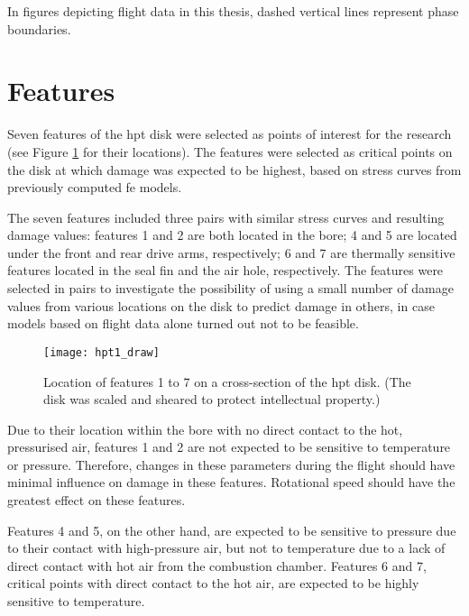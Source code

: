 In figures depicting flight data in this thesis, dashed vertical lines represent phase boundaries.

\section{Features} \label{sec:features}
Seven features of the \ac{hpt} disk were selected as points of interest for the research (see Figure \ref{fig:hpt1} for their locations). The features were selected as critical points on the disk at which damage was expected to be highest, based on stress curves from previously computed \ac{fe} models.

The seven features included three pairs with similar stress curves and resulting damage values: features 1 and 2 are both located in the bore; 4 and 5 are located under the front and rear drive arms, respectively; 6 and 7 are thermally sensitive features located in the seal fin and the air hole, respectively. The features were selected in pairs to investigate the possibility of using a small number of damage values from various locations on the disk to predict damage in others, in case models based on flight data alone turned out not to be feasible.

\begin{figure}[tb!]
    \centering
    \texttt{[image: hpt1\_draw]}
    \caption{\label{fig:hpt1} Location of features 1 to 7 on a cross-section of the \ac{hpt} disk. (The disk was scaled and sheared to protect intellectual property.)}
\end{figure}

Due to their location within the bore with no direct contact to the hot, pressurised air, features 1 and 2 are not expected to be sensitive to temperature or pressure. Therefore, changes in these parameters during the flight should have minimal influence on damage in these features. Rotational speed should have the greatest effect on these features.

Features 4 and 5, on the other hand, are expected to be sensitive to pressure due to their contact with high-pressure air, but not to temperature due to a lack of direct contact with hot air from the combustion chamber. Features 6 and 7, critical points with direct contact to the hot air, are expected to be highly sensitive to temperature.

